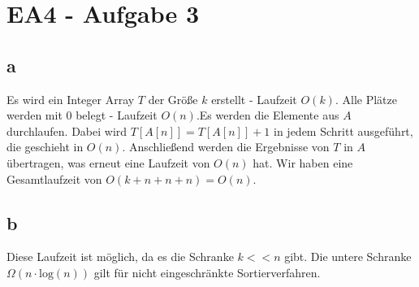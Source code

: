 \documentclass[12pt]{article}
\begin{document}
\section*{EA4 - Aufgabe 3}

\subsection*{a}
Es wird ein Integer Array $T$ der Größe $k$ erstellt - Laufzeit $O(k)$. Alle Plätze werden mit $0$ belegt - Laufzeit $O(n)$.Es werden die Elemente aus $A$ durchlaufen. Dabei
wird $T[A[n]] = T[A[n]] + 1$ in jedem Schritt ausgeführt, die geschieht in $O(n)$. Anschließend werden die Ergebnisse von $T$ in $A$ übertragen, was erneut eine
Laufzeit von $O(n)$ hat. Wir haben eine Gesamtlaufzeit von $O(k+n+n+n)=O(n)$. 

\subsection*{b}
Diese Laufzeit ist möglich, da es die Schranke $k << n$ gibt. Die untere Schranke $\Omega (n  \cdot \text{log}(n))$ gilt für nicht eingeschränkte Sortierverfahren.
\end{document}
